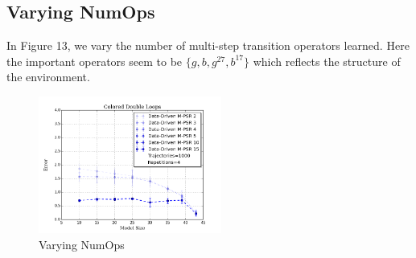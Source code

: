 \subsection{Varying NumOps}

In Figure 13, we vary the number of multi-step transition operators learned. Here the important operators seem to be $\{g,b,g^{27},b^{17}\}$ which reflects the structure of the environment.

\begin{figure}[ht!]
\centering
\includegraphics[width=60mm]{uCOREPICS/DLMO/numOpComparison.png}
\caption{Varying NumOps\label{overflow}}
\end{figure}
